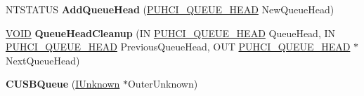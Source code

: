 \begin{DoxyCompactItemize}
N\+T\+S\+T\+A\+T\+US {\bfseries Add\+Queue\+Head} (\hyperlink{struct___u_h_c_i___q_u_e_u_e___h_e_a_d}{P\+U\+H\+C\+I\+\_\+\+Q\+U\+E\+U\+E\+\_\+\+H\+E\+AD} New\+Queue\+Head)
\item 
\mbox{\label{class_c_u_s_b_queue_af6e941ef60ab272bf22e8085854993c5}} 
\hyperlink{interfacevoid}{V\+O\+ID} {\bfseries Queue\+Head\+Cleanup} (IN \hyperlink{struct___u_h_c_i___q_u_e_u_e___h_e_a_d}{P\+U\+H\+C\+I\+\_\+\+Q\+U\+E\+U\+E\+\_\+\+H\+E\+AD} Queue\+Head, IN \hyperlink{struct___u_h_c_i___q_u_e_u_e___h_e_a_d}{P\+U\+H\+C\+I\+\_\+\+Q\+U\+E\+U\+E\+\_\+\+H\+E\+AD} Previous\+Queue\+Head, O\+UT \hyperlink{struct___u_h_c_i___q_u_e_u_e___h_e_a_d}{P\+U\+H\+C\+I\+\_\+\+Q\+U\+E\+U\+E\+\_\+\+H\+E\+AD} $\ast$Next\+Queue\+Head)
\item 
\mbox{\label{class_c_u_s_b_queue_aae24f6667a154d998489c7420db869d2}} 
{\bfseries C\+U\+S\+B\+Queue} (\hyperlink{interface_i_unknown}{I\+Unknown} $\ast$Outer\+Unknown)
\end{DoxyCompactItemize}
